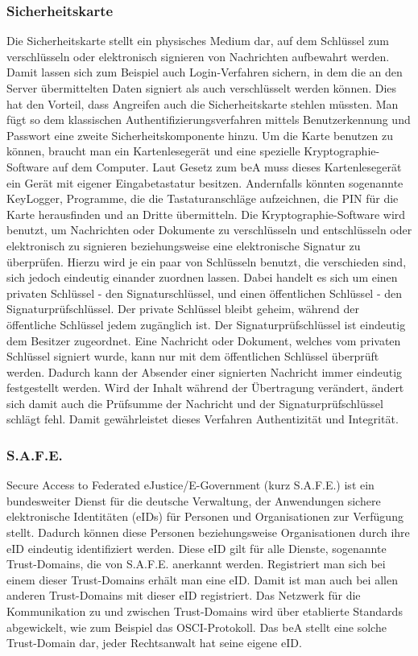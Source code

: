 \subsubsection{Sicherheitskarte}
Die Sicherheitskarte stellt ein physisches Medium dar, auf dem Schlüssel zum verschlüsseln oder elektronisch signieren von Nachrichten aufbewahrt werden. Damit lassen sich zum Beispiel auch Login-Verfahren sichern, in dem die an den Server übermittelten Daten signiert als auch verschlüsselt werden können. Dies hat den Vorteil, dass Angreifen auch die Sicherheitskarte stehlen müssten. Man fügt so dem klassischen Authentifizierungsverfahren mittels Benutzerkennung und Passwort eine zweite Sicherheitskomponente hinzu. Um die Karte benutzen zu können, braucht man ein Kartenlesegerät und eine spezielle Kryptographie-Software auf dem Computer. Laut Gesetz zum beA muss dieses Kartenlesegerät ein Gerät mit eigener Eingabetastatur besitzen. Andernfalls könnten sogenannte KeyLogger, Programme, die die Tastaturanschläge aufzeichnen, die PIN für die Karte herausfinden und an Dritte übermitteln. Die Kryptographie-Software wird benutzt, um Nachrichten oder Dokumente zu verschlüsseln und entschlüsseln oder elektronisch zu signieren beziehungsweise eine elektronische Signatur zu überprüfen. Hierzu wird je ein paar von Schlüsseln benutzt, die verschieden sind, sich jedoch eindeutig einander zuordnen lassen. Dabei handelt es sich um einen privaten Schlüssel - den Signaturschlüssel, und einen öffentlichen Schlüssel - den Signaturprüfschlüssel. Der private Schlüssel bleibt geheim, während der öffentliche Schlüssel jedem zugänglich ist. Der Signaturprüfschlüssel ist eindeutig dem Besitzer zugeordnet. Eine Nachricht oder Dokument, welches vom privaten Schlüssel signiert wurde, kann nur mit dem öffentlichen Schlüssel überprüft werden. Dadurch kann der Absender einer signierten Nachricht immer eindeutig festgestellt werden. Wird der Inhalt während der Übertragung verändert, ändert sich damit auch die Prüfsumme der Nachricht und der Signaturprüfschlüssel schlägt fehl. Damit gewährleistet dieses Verfahren Authentizität und Integrität.

\subsubsection{S.A.F.E.}
Secure Access to Federated eJustice/E-Government (kurz S.A.F.E.) ist ein bundesweiter Dienst für die deutsche Verwaltung, der Anwendungen sichere elektronische Identitäten (eIDs) für Personen und Organisationen zur Verfügung stellt. Dadurch können diese Personen beziehungsweise Organisationen durch ihre eID eindeutig identifiziert werden. Diese eID gilt für alle Dienste, sogenannte Trust-Domains, die von S.A.F.E. anerkannt werden. Registriert man sich bei einem dieser Trust-Domains erhält man eine eID. Damit ist man auch bei allen anderen Trust-Domains mit dieser eID registriert. Das Netzwerk für die Kommunikation zu und zwischen Trust-Domains wird über etablierte Standards abgewickelt, wie zum Beispiel das OSCI-Protokoll. Das beA stellt eine solche Trust-Domain dar, jeder Rechtsanwalt hat seine eigene eID.


